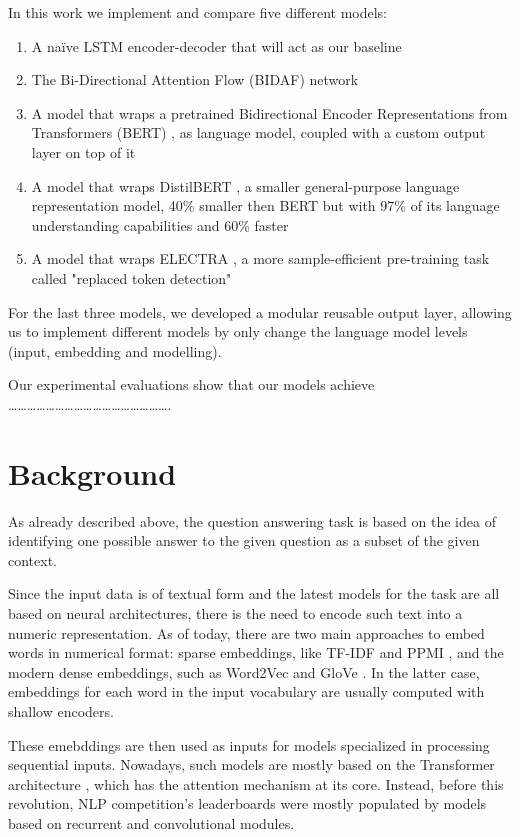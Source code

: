 \documentclass[a4paper,10pt]{report}
\begin{document}
In this work we implement and compare five different models:
\begin{enumerate}
  \item A naïve LSTM encoder-decoder that will act as our baseline
  \item The Bi-Directional Attention Flow (BIDAF) network \cite{bidaf}
  \item A model that wraps a pretrained Bidirectional Encoder Representations from Transformers (BERT) \cite{bert}, as language model, coupled with a custom output layer on top of it
  \item A model that wraps DistilBERT \cite{distilbert}, a smaller general-purpose language representation model, 40\% smaller then BERT but with 97\% of its language understanding capabilities and 60\% faster
  \item A model that wraps ELECTRA \cite{electra}, a more sample-efficient pre-training task called "replaced token detection"
\end{enumerate}
For the last three models, we developed a modular reusable output layer, allowing us to implement different models by only change the language model levels (input, embedding and modelling).

Our experimental evaluations show that our models achieve …………………………………………….

\chapter{Background}\label{chap:background}

As already described above, the question answering task is based on the idea of identifying one possible answer to the given question as a subset of the given context.

Since the input data is of textual form and the latest models for the task are all based on neural architectures, there is the need to encode such text into a numeric representation. As of today, there are two main approaches to embed words in numerical format: sparse embeddings, like TF-IDF \cite{tf-idf} and PPMI \cite{ppmi}, and the modern dense embeddings, such as Word2Vec \cite{word2vec} and GloVe \cite{glove}. In the latter case, embeddings for each word in the input vocabulary are usually computed with shallow encoders.

These emebddings are then used as inputs for models specialized in processing sequential inputs. Nowadays, such models are mostly based on the Transformer architecture \cite{transformers}, which has the attention mechanism at its core. Instead, before this revolution, NLP competition's leaderboards were mostly populated by models based on recurrent and convolutional modules.
\end{document}

